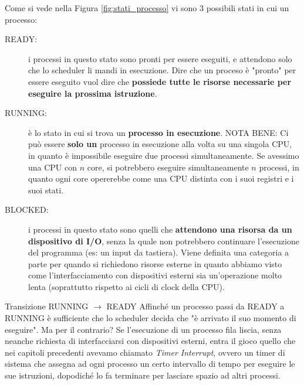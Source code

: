 \documentclass[12pt]{report}
\begin{document}
	Come si vede nella Figura \ref{fig:stati_processo} vi sono 3 possibili stati in cui un processo:
	\begin{description}
		\item [READY:] i processi in questo stato sono pronti per essere eseguiti, e attendono solo che lo scheduler li mandi in esecuzione. Dire che un proceso è "pronto" per essere eseguito vuol dire che \textbf{possiede tutte le risorse necessarie per eseguire la prossima istruzione}.
		
		\item[RUNNING:] è lo stato in cui si trova un \textbf{processo in esecuzione}. NOTA BENE: Ci può essere \textbf{solo un} processo in esecuzione alla volta su una singola CPU, in quanto è impossibile eseguire due processi simultaneamente.
		Se avessimo una CPU con $n$ core, si potrebbero eseguire simultaneamente $n$ processi, in quanto ogni core opererebbe come una CPU distinta con i suoi registri e i suoi stati.
		
		\item[BLOCKED:] i processi in questo stato sono quelli che \textbf{attendono una risorsa da un dispositivo di I/O}, senza la quale non potrebbero continuare l'esecuzione del programma (es: un input da tastiera). Viene definita una categoria a parte per quando si richiedono risorse esterne in quanto abbiamo visto come l'interfacciamento con dispositivi esterni sia un'operazione molto lenta (soprattutto rispetto ai cicli di clock della CPU). 
	\end{description}
	
	\begin{osservazione}{Transizione RUNNING $\rightarrow$ READY}{}
		Affinché un processo passi da READY a RUNNING è sufficiente che lo scheduler decida che "è arrivato il suo momento di eseguire".
		\smallbreak
		Ma per il contrario? Se l'esecuzione di un processo fila liscia, senza neanche richiesta di interfacciarsi con dispositivi esterni, entra il gioco quello che nei capitoli precedenti avevamo chiamato \textit{Timer Interrupt}, ovvero un timer di sistema che assegna ad ogni processo un certo intervallo di tempo per eseguire le sue istruzioni, dopodiché lo fa terminare per lasciare spazio ad altri processi.
	\end{osservazione}
	
\end{document}
